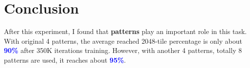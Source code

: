 \chapter{Conclusion}
\indent
	After this experiment, I found that \textbf{patterns} play an important role in this task.\\
	With original 4 patterns, the average reached 2048-tile percentage is only about \textcolor{blue}{\textbf{90\%}} after 350K iterations training.
	However, with another 4 patterns, totally 8 patterns are used, it reaches about \textcolor{blue}{\textbf{95\%}}.
